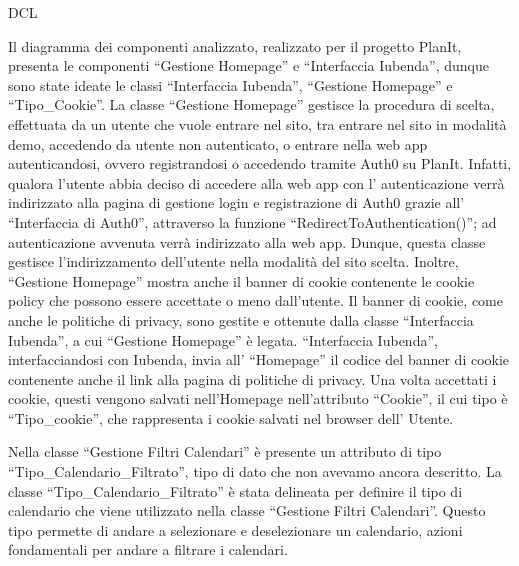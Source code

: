 \begin{listaPersonale}{DCL}
        


    Il diagramma dei componenti analizzato, realizzato per il progetto PlanIt, presenta le componenti “Gestione Homepage” e “Interfaccia Iubenda”, dunque sono state ideate le classi “Interfaccia Iubenda”, “Gestione Homepage” e “Tipo\_Cookie”.
    La classe “Gestione Homepage” gestisce la procedura di scelta, effettuata da un utente che vuole entrare nel sito, tra entrare nel sito in modalità demo, accedendo da utente non autenticato, o entrare nella web app autenticandosi, ovvero registrandosi o accedendo tramite Auth0 su PlanIt. Infatti, qualora l'utente abbia deciso di accedere alla web app con l' autenticazione verrà indirizzato alla pagina di gestione login e registrazione di Auth0 grazie all' “Interfaccia di Auth0”, attraverso la funzione “RedirectToAuthentication()”; ad autenticazione avvenuta verrà indirizzato alla web app. Dunque, questa classe gestisce l'indirizzamento dell'utente nella modalità del sito scelta. Inoltre, “Gestione Homepage” mostra anche il banner di cookie contenente le cookie policy che possono essere accettate o meno dall'utente. Il banner di cookie, come anche le politiche di privacy, sono gestite e ottenute dalla classe “Interfaccia Iubenda”, a cui “Gestione Homepage” è legata. “Interfaccia Iubenda”, interfacciandosi con Iubenda, invia all' “Homepage” il codice del banner di cookie contenente anche il link alla pagina di politiche di privacy. Una volta accettati i cookie, questi vengono salvati nell'Homepage nell'attributo “Cookie”, il cui tipo è “Tipo\_cookie”, che rappresenta i cookie salvati nel browser dell' Utente.
    
    
        \begin{center}
            
        \end{center}
    
        

    Nella classe “Gestione Filtri Calendari” è presente un attributo di tipo “Tipo\_Calendario\_Filtrato”, tipo di dato che non avevamo ancora descritto. La classe “Tipo\_Calendario\_Filtrato” è stata delineata per definire il tipo di calendario che viene utilizzato nella classe “Gestione Filtri Calendari”. Questo tipo permette di andare a selezionare e deselezionare un calendario, azioni fondamentali per andare a filtrare i calendari.
    

\end{listaPersonale}
